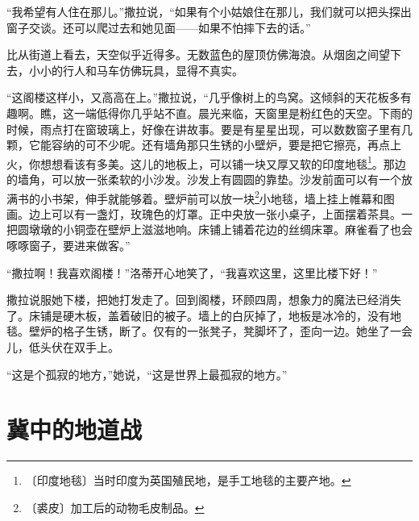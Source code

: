\documentclass[12pt,UTF-8,openany]{ctexbook}
\begin{document}
\begin{large}
    “我希望有人住在那儿。”撒拉说，“如果有个小姑娘住在那儿，我们就可以把头探出窗子交谈。还可以爬过去和她见面——如果不怕摔下去的话。”
    
    比从街道上看去，天空似乎近得多。无数蓝色的屋顶仿佛海浪。从烟囱之间望下去，小小的行人和马车仿佛玩具，显得不真实。
    
    “这阁楼这样小，又高高在上。”撒拉说，“几乎像树上的鸟窝。这倾斜的天花板多有趣啊。瞧，这一端低得你几乎站不直。晨光来临，天窗里是粉红色的天空。下雨的时候，雨点打在窗玻璃上，好像在讲故事。要是有星星出现，可以数数窗子里有几颗，它能容纳的可不少呢。还有墙角那只生锈的小壁炉，要是把它擦亮，再点上火，你想想看该有多美。这儿的地板上，可以铺一块又厚又软的印度地毯\footnote{〔印度地毯〕当时印度为英国殖民地，是手工地毯的主要产地。}。那边的墙角，可以放一张柔软的小沙发。沙发上有圆圆的靠垫。沙发前面可以有一个放满书的小书架，伸手就能够着。壁炉前可以放一块\footnote{〔裘皮〕加工后的动物毛皮制品。}小地毯，墙上挂上帷幕和图画。边上可以有一盏灯，玫瑰色的灯罩。正中央放一张小桌子，上面摆着茶具。一把圆墩墩的小铜壶在壁炉上滋滋地响。床铺上铺着花边的丝绸床罩。麻雀看了也会啄啄窗子，要进来做客。”
    
    “撒拉啊！我喜欢阁楼！”洛蒂开心地笑了，“我喜欢这里，这里比楼下好！”
    
    撒拉说服她下楼，把她打发走了。回到阁楼，环顾四周，想象力的魔法已经消失了。床铺是硬木板，盖着破旧的被子。墙上的白灰掉了，地板是冰冷的，没有地毯。壁炉的格子生锈，断了。仅有的一张凳子，凳脚坏了，歪向一边。她坐了一会儿，低头伏在双手上。
    
    “这是个孤寂的地方，”她说，“这是世界上最孤寂的地方。”
    
\end{large}



\chapter{冀中的地道战}
\end{document}
